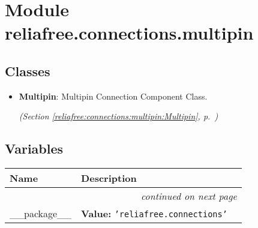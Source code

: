 %
%
%


\section{Module reliafree.connections.multipin}

    \label{reliafree:connections:multipin}


\subsection{Classes}

\begin{itemize}  \setlength{\parskip}{0ex}
  \item \textbf{Multipin}: Multipin Connection Component Class.



  \textit{(Section \ref{reliafree:connections:multipin:Multipin}, p.~\pageref{reliafree:connections:multipin:Multipin})}

\end{itemize}


  \subsection{Variables}

    \vspace{-1cm}
\hspace{\varindent}\begin{longtable}{|p{\varnamewidth}|p{\vardescrwidth}|l}
\cline{1-2}
\cline{1-2} \centering \textbf{Name} & \centering \textbf{Description}& \\
\cline{1-2}
\endhead\cline{1-2}\multicolumn{3}{r}{\small\textit{continued on next page}}\\\endfoot\cline{1-2}
\endlastfoot\raggedright \_\-\_\-p\-a\-c\-k\-a\-g\-e\-\_\-\_\- & \raggedright \textbf{Value:} 
{\tt \texttt{'}\texttt{reliafree.connections}\texttt{'}}&\\
\cline{1-2}
\end{longtable}

